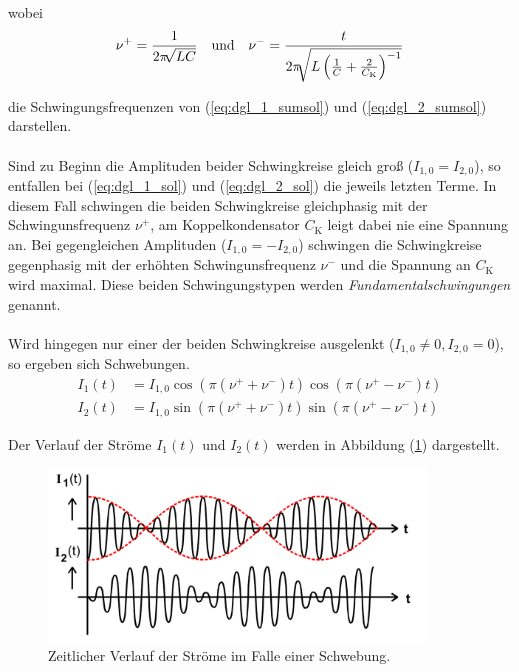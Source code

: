 wobei 
\begin{align}
    \nu^+ &= \frac {1} {2 \pi \sqrt[]{LC}} & \mbox{\centering und} && \nu^- = \frac {t} {2 \pi \sqrt [] {L \left( \frac{1}{C} + \frac{2}{C_\text{K}} \right)^{-1} }}
\end{align}

die Schwingungsfrequenzen von (\ref{eq:dgl_1_sumsol}) und (\ref{eq:dgl_2_sumsol}) darstellen. \\
\\
Sind zu Beginn die Amplituden beider Schwingkreise gleich groß ($I_{1,0} = I_{2,0}$), so entfallen bei (\ref{eq:dgl_1_sol}) und (\ref{eq:dgl_2_sol})
die jeweils letzten Terme. In diesem Fall schwingen die beiden Schwingkreise gleichphasig mit der Schwingunsfrequenz $\nu^+$, am
Koppelkondensator $C_\text{K}$ leigt dabei nie eine Spannung an. Bei gegengleichen Amplituden ($I_{1,0} = -I_{2,0}$) schwingen die Schwingkreise gegenphasig
mit der erhöhten Schwingunsfrequenz $\nu^-$ und die Spannung an $C_\text{K}$ wird maximal. Diese beiden Schwingungstypen werden \textit{Fundamentalschwingungen} genannt. \\
\\
Wird hingegen nur einer der beiden Schwingkreise ausgelenkt ($I_{1,0} \neq 0, I_{2,0} = 0$), so ergeben sich Schwebungen.
\begin{align}
    I_{1}(t) &= I_{1,0} \cos(\pi (\nu^+ + \nu^-) t) \cos(\pi (\nu^+ - \nu^-) t) \label{eq:dgl_1_sol_schweb} \\
    I_{2}(t) &= I_{1,0} \sin(\pi (\nu^+ + \nu^-) t) \sin(\pi (\nu^+ - \nu^-) t) \label{eq:dgl_2_sol_schweb} 
\end{align}

Der Verlauf der Ströme $I_{1}(t)$ und $I_{2}(t)$ werden in Abbildung (\ref{fig:schwebung}) dargestellt.
\begin{figure} 
    \centering
    \includegraphics[width=10cm] {pictures/schwebung.png} 
    \caption{Zeitlicher Verlauf der Ströme im Falle einer Schwebung. \cite{v355}}
    \label{fig:schwebung}
\end{figure} 

